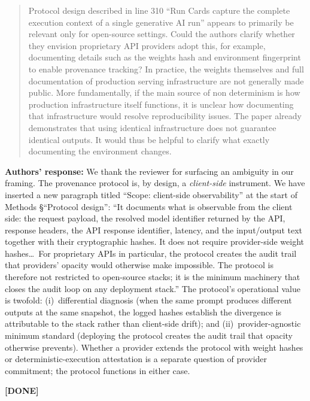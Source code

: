 \documentclass[11pt,a4paper]{article}
\newenvironment{revquote}{%
  \begin{quote}\small\itshape\color{revgray}
}{%
  \end{quote}
}
\newcommand{\response}[1]{\par\noindent\textbf{\color{revgreen}Authors' response:} #1\par}
\newcommand{\done}{\color{revgreen}\textbf{[DONE]}}
\begin{document}
\begin{revquote}
Protocol design described in line 310 ``Run Cards capture the complete execution context of a single generative AI run'' appears to primarily be relevant only for open-source settings. Could the authors clarify whether they envision proprietary API providers adopt this, for example, documenting details such as the weights hash and environment fingerprint to enable provenance tracking? In practice, the weights themselves and full documentation of production serving infrastructure are not generally made public. More fundamentally, if the main source of non determinism is how production infrastructure itself functions, it is unclear how documenting that infrastructure would resolve reproducibility issues. The paper already demonstrates that using identical infrastructure does not guarantee identical outputs. It would thus be helpful to clarify what exactly documenting the environment changes.
\end{revquote}

\response{We thank the reviewer for surfacing an ambiguity in our framing. The provenance protocol is, by design, a \emph{client-side} instrument. We have inserted a new paragraph titled ``Scope: client-side observability'' at the start of Methods §``Protocol design'': ``It documents what is observable from the client side: the request payload, the resolved model identifier returned by the API, response headers, the API response identifier, latency, and the input/output text together with their cryptographic hashes. It does not require provider-side weight hashes\ldots\ For proprietary APIs in particular, the protocol creates the audit trail that providers' opacity would otherwise make impossible. The protocol is therefore not restricted to open-source stacks; it is the minimum machinery that closes the audit loop on any deployment stack.'' The protocol's operational value is twofold: (i)~differential diagnosis (when the same prompt produces different outputs at the same snapshot, the logged hashes establish the divergence is attributable to the stack rather than client-side drift); and (ii)~provider-agnostic minimum standard (deploying the protocol creates the audit trail that opacity otherwise prevents). Whether a provider extends the protocol with weight hashes or deterministic-execution attestation is a separate question of provider commitment; the protocol functions in either case.} \done
\end{document}
